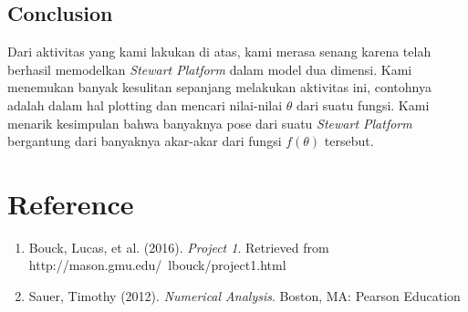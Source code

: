 \documentclass[11pt]{article}
\begin{document}
\begin{multicols}{2}
\section{Conclusion}
\label{sec:Conclusion}

Dari aktivitas yang kami lakukan di atas, kami merasa senang karena telah berhasil memodelkan \textit{Stewart Platform} dalam model dua dimensi. Kami menemukan banyak kesulitan sepanjang melakukan aktivitas ini, contohnya adalah dalam hal plotting dan mencari nilai-nilai $\theta$ dari suatu fungsi. Kami menarik kesimpulan bahwa banyaknya pose dari suatu \textit{Stewart Platform} bergantung dari banyaknya akar-akar dari fungsi $f(\theta)$ tersebut.

\end{multicols}

\section{Reference}
\label{sec:Reference}
\begin{enumerate}
    \item Bouck, Lucas, et al. (2016). \textit{Project 1}. Retrieved from http://mason.gmu.edu/~lbouck/project1.html
    \item Sauer, Timothy (2012). \textit{Numerical Analysis}. Boston, MA: Pearson Education
\end{enumerate}
\end{document}
